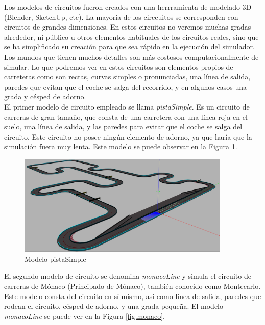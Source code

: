 Los modelos de circuitos fueron creados con una herrramienta de modelado 3D (Blender, SketchUp, etc). La mayoría de los circcuitos se corresponden con circuitos de grandes dimensiones. En estos circuitos no veremos muchas gradas alrededor, ni público u otros elementos habituales de los circuitos reales, sino que se ha simplificado su creación para que sea rápido en la ejecución del simulador. Los mundos que tienen muchos detalles son más costosos computacionalmente de simular. Lo que podremos ver en estos circuitos son elementos propios de carreteras como son rectas, curvas simples o pronunciadas, una línea de salida, paredes que evitan que el coche se salga del recorrido, y en algunos casos una grada y césped de adorno.\\

El primer modelo de circuito empleado se llama \textit{pistaSimple}. Es un circuito de carreras de gran tamaño, que consta de una carretera con una línea roja en el suelo, una línea de salida, y las paredes para evitar que el coche se salga del circuito. Este circuito no posee ningún elemento de adorno, ya que haría que la simulación fuera muy lenta. Este modelo se puede observar en la Figura \ref{fig.simple}.\\

\begin{figure}[H]
  \begin{center}
    \includegraphics[width=0.9\textwidth]{figures/Infraestructura/circuit_Simple.png}
		\caption{Modelo pistaSimple}
		\label{fig.simple}
		\end{center}
\end{figure}

El segundo modelo de circuito se denomina \textit{monacoLine} y simula el circuito de carreras de Mónaco (Principado de Mónaco), también conocido como Montecarlo. Este modelo consta del circuito en sí mismo, así como línea de salida, paredes que rodean el circuito, césped de adorno, y una grada pequeña. El modelo \textit{monacoLine} se puede ver en la Figura \ref{fig.monaco}.\\


